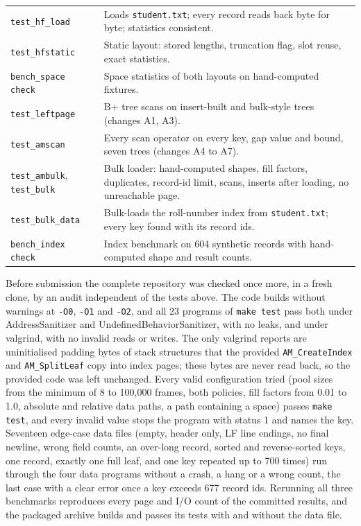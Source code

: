 \documentclass[11pt,a4paper]{article}
\begin{document}
\begin{table}[H]
\begin{tabularx}{\textwidth}{lY}
\texttt{test\_hf\_load} & Loads \texttt{student.txt}; every record reads back byte for byte; statistics consistent. \\
\texttt{test\_hfstatic} & Static layout: stored lengths, truncation flag, slot reuse, exact statistics. \\
\texttt{bench\_space check} & Space statistics of both layouts on hand-computed fixtures. \\
\texttt{test\_leftpage} & B+ tree scans on insert-built and bulk-style trees (changes A1, A3). \\
\texttt{test\_amscan} & Every scan operator on every key, gap value and bound, seven trees (changes A4 to A7). \\
\texttt{test\_ambulk}, \texttt{test\_bulk} & Bulk loader: hand-computed shapes, fill factors, duplicates, record-id limit, scans, inserts after loading, no unreachable page. \\
\texttt{test\_bulk\_data} & Bulk-loads the roll-number index from \texttt{student.txt}; every key found with its record ids. \\
\texttt{bench\_index check} & Index benchmark on 604 synthetic records with hand-computed shape and result counts. \\
\bottomrule
\end{tabularx}
\end{table}

Before submission the complete repository was checked once more, in a fresh clone, by an audit independent of the tests above. The code builds without warnings at \texttt{-O0}, \texttt{-O1} and \texttt{-O2}, and all 23 programs of \texttt{make test} pass both under AddressSanitizer and UndefinedBehaviorSanitizer, with no leaks, and under valgrind, with no invalid reads or writes. The only valgrind reports are uninitialised padding bytes of stack structures that the provided \texttt{AM\_CreateIndex} and \texttt{AM\_SplitLeaf} copy into index pages; these bytes are never read back, so the provided code was left unchanged. Every valid configuration tried (pool sizes from the minimum of 8 to 100{,}000 frames, both policies, fill factors from 0.01 to 1.0, absolute and relative data paths, a path containing a space) passes \texttt{make test}, and every invalid value stops the program with status 1 and names the key. Seventeen edge-case data files (empty, header only, LF line endings, no final newline, wrong field counts, an over-long record, sorted and reverse-sorted keys, one record, exactly one full leaf, and one key repeated up to 700 times) run through the four data programs without a crash, a hang or a wrong count, the last case with a clear error once a key exceeds 677 record ids. Rerunning all three benchmarks reproduces every page and I/O count of the committed results, and the packaged archive builds and passes its tests with and without the data file.
\end{document}
